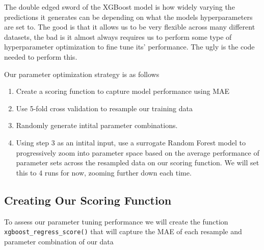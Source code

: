 \documentclass[]{book}
\theoremstyle{definition}
\theoremstyle{definition}
\theoremstyle{definition}
\theoremstyle{remark}
\begin{document}
The double edged sword of the XGBoost model is how widely varying the
predictions it generates can be depending on what the models
hyperparameters are set to. The good is that it allows us to be very
flexible across many different datasets, the bad is it almost always
requires us to perform some type of hyperparameter optimization to fine
tune its' performance. The ugly is the code needed to perform this.

Our parameter optimization strategy is as follows

\begin{enumerate}
\def\labelenumi{\arabic{enumi}.}
\item
  Create a scoring function to capture model performance using MAE
\item
  Use 5-fold cross validation to resample our training data
\item
  Randomly generate intital parameter combinations.
\item
  Using step 3 as an intital input, use a surrogate Random Forest model
  to progressively zoom into parameter space based on the average
  performance of parameter sets across the resampled data on our scoring
  function. We will set this to 4 runs for now, zooming further down
  each time.
\end{enumerate}

\subsection{Creating Our Scoring
Function}\label{creating-our-scoring-function}

To assess our parameter tuning performance we will create the function
\texttt{xgboost\_regress\_score()} that will capture the MAE of each
resample and parameter combination of our data
\end{document}
